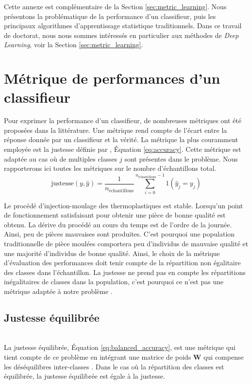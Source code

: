 \bigskip

Cette annexe est complémentaire de la Section \ref{sec:metric_learning}.
Nous présentons la problématique de la performance d'un classifieur, puis les principaux algorithmes d'apprentissage statistique traditionnels.
Dans ce travail de doctorat, nous nous sommes intéressés en particulier aux méthodes de \textit{Deep Learning}, voir la Section \ref{sec:metric_learning}.

\section{Métrique de performances d'un classifieur}
Pour exprimer la performance d'un classifieur, de nombreuses métriques ont été proposées dans la littérature.
Une métrique rend compte de l'écart entre la réponse donnée par un classifieur et la vérité.
La métrique la plus couramment employée est la justesse définie par \citeauthor{metz_basic_1978} \cite{metz_basic_1978}, Équation \ref{eq:accuracy}.
Cette métrique est adaptée au cas où de multiples classes $j$ sont présentes dans le problème.
Nous rapporterons ici toutes les métriques sur le nombre d'échantillons total.
\begin{equation} \label{eq:accuracy}
\text{justesse}(y, \hat{y})=\frac{1}{n_{\mathrm{\acute{e}chantillons}}} \sum_{i=0}^{n_{\mathrm{\acute{e}chantillons}}-1} 1\left(\hat{y}_{j}=y_{j}\right)
\end{equation}

Le procédé d'injection-moulage des thermoplastiques est stable.
Lorsqu'un point de fonctionnement satisfaisant pour obtenir une pièce de bonne qualité est obtenu.
La dérive du procédé au cours du temps est de l'ordre de la journée.
Ainsi, peu de pièces mauvaises sont produites.
C'est pourquoi une population traditionnelle de pièce moulées comportera peu d'individus de mauvaise qualité et une majorité d'individus de bonne qualité.
Ainsi, le choix de la métrique d'évaluation des performances doit tenir compte de la répartition non égalitaire des classes dans l'échantillon.
La justesse ne prend pas en compte les répartitions inégalitaires de classes dans la population, c'est pourquoi ce n'est pas une métrique adaptée à notre problème \cite{japkowicz_class_2002}.

\subsection{Justesse équilibrée}\mbox{} \\
La justesse équilibrée, Équation \ref{eq:balanced_accuracy}, est une métrique qui tient compte de ce problème en intégrant une matrice de poids $\mathbf{W}$ qui compense les déséquilibres inter-classes \cite{brodersen_balanced_2010, mosley_balanced_2013}.
Dans le cas où la répartition des classes est équilibrée, la justesse équilibrée est égale à la justesse.

